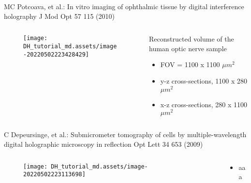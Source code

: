 \documentclass[t, aspectratio=169]{beamer}
\begin{document}
\begin{frame}{MC Potcoava, et al.: In vitro imaging of ophthalmic tissue by digital interference holography}
	\vspace{-3 mm}
	\small J Mod Opt 57 115 (2010)
	\begin{columns}
		\begin{column}{.6\textwidth}
			\begin{figure}
				\texttt{[image: DH\_tutorial\_md.assets/image-20220502223428429]}
			\end{figure}
		\end{column}
		\begin{column}{.4\textwidth}
			Reconstructed volume of the human optic nerve sample
			\begin{itemize}
				\item[a) ] FOV = 1100 x 1100 $\mu m^2 $
				\item[b) ] y-z cross-sections, 1100 x 280 $\mu m^2 $
				\item[c) ] x-z cross-sections, 280 x 1100 $\mu m^2 $
			\end{itemize}
		\end{column}
	\end{columns}
\end{frame}


\begin{frame}{C Depeursinge, et al.: Submicrometer tomography of cells by multiple-wavelength digital holographic microscopy in reflection}
	\vspace{-3 mm}
	\small Opt Lett 34 653 (2009)
	\begin{columns}
		\begin{column}{.6\textwidth}
			\begin{figure}
				\texttt{[image: DH\_tutorial\_md.assets/image-20220502223113698]}
			\end{figure}
		\end{column}
		\begin{column}{.4\textwidth}
			\begin{itemize}
				\item aaa
			\end{itemize}
		\end{column}
	\end{columns}
\end{frame}
\end{document}
